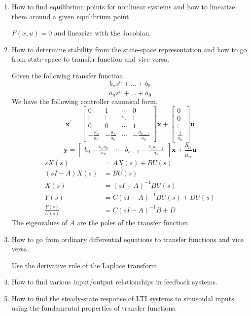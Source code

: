 \documentclass[10pt]{article}
\begin{document}
\begin{enumerate}
    \item How to find equilibrium points for nonlinear systems and
    how to linearize them around a given equilibrium point.

    \(F(x,u)=0\) and linearize with the Jacobian.

    \item How to determine stability from the state-space representation
    and how to go from state-space to transfer function and vice versa.

    Given the following transfer function.
    \[\frac{b_ns^n+\ldots+b_0}{a_ns^n+\ldots+a_0}\]
    We have the following controller canonical form.
    \[\mathbf{x}^\prime=\begin{bmatrix}
        0 & 1 & \cdots & 0\\
        \vdots & \vdots & \ddots & \vdots\\
        0 & 0 & \cdots & 1\\
        -\frac{a_0}{a_n} & -\frac{a_1}{a_n} & \cdots & -\frac{a_{n-1}}{a_n}
    \end{bmatrix}\mathbf{x}
    + \begin{bmatrix} 0\\ 0\\ \vdots\\ \frac{1}{a_n}\end{bmatrix}\mathbf{u}\]
    \[\mathbf{y}=\begin{bmatrix}
        b_0-\frac{b_na_0}{a_n} & \cdots &  b_{n-1}-\frac{b_na_{n-1}}{a_n}
    \end{bmatrix}\mathbf{x} + \frac{b_n}{a_n}\mathbf{u}\]
    \begin{align*}
        sX(s)&=AX(s)+BU(s)\\
        (sI-A)X(s)&=BU(s)\\
        X(s)&=(sI-A)^{-1}BU(s)\\
        Y(s)&=C(sI-A)^{-1}BU(s)+DU(s)\\
        \frac{Y(s)}{U(s)}&=C(sI-A)^{-1}B+D
    \end{align*}
    The eigenvalues of \(A\) are the poles of the transfer function.

    \item How to go from ordinary differential equations to transfer functions and vice versa.

    Use the derivative rule of the Laplace transform.

    \item How to find various input/output relationships in feedback systems.
    \item How to find the steady-state response of LTI systems to sinusoidal inputs using the
    fundamental properties of transfer functions.


\end{enumerate}
\end{document}
